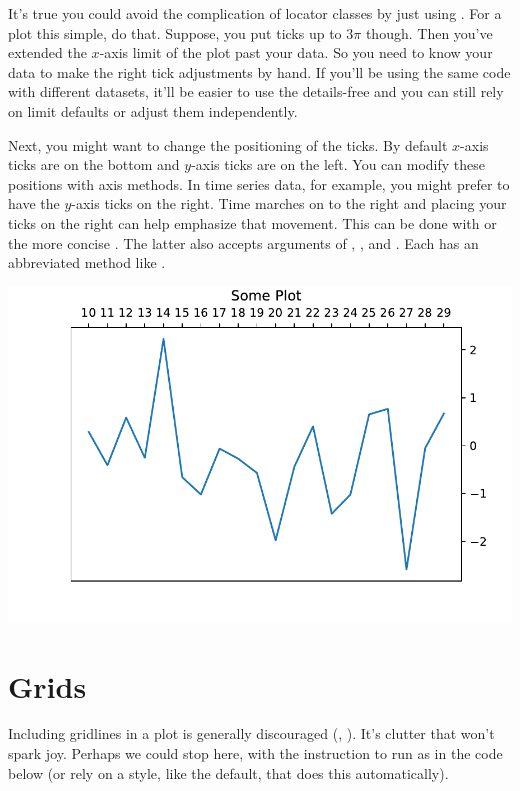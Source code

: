 It's true you could avoid the complication of locator classes by just using . For a plot this simple, do that. Suppose, you put ticks up to $3\pi$ though. Then you've extended the $x$-axis limit of the plot past your data. So you need to know your data to make the right tick adjustments by hand. If you'll be using the same code with different datasets, it'll be easier to use the details-free  and you can still rely on limit defaults or adjust them independently. 

Next, you might want to change the positioning of the ticks. By default $x$-axis ticks are on the bottom and $y$-axis ticks are on the left. You can modify these positions with axis methods. In time series data, for example, you might prefer to have the $y$-axis ticks on the right. Time marches on to the right and placing your ticks on the right can help emphasize that movement. This can be done with  or the more concise . The latter also accepts arguments of , , and . Each has an abbreviated method like . 


\begin{center}
    \includegraphics[width = .7\textwidth]{figures/proseplots/tick-right.pdf}
\end{center}

\section{Grids}

Including gridlines in a plot is generally discouraged (\cite{knaflic2015storytelling}, \cite{schwabish2021better}). It's clutter that won't spark joy. Perhaps we could stop here, with the instruction to run  as in the code below (or rely on a style, like the default, that does this automatically).

